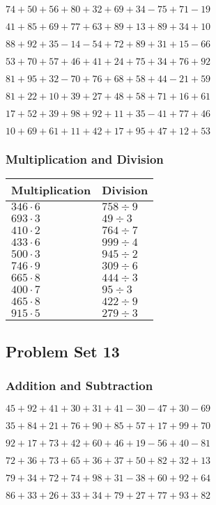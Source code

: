 \(74+50+56+80+32+69+34-75+71-19\)

\(41+85+69+77+63+89+13+89+34+10\)

\(88+92+35-14-54+72+89+31+15-66\)

\(53+70+57+46+41+24+75+34+76+92\)

\(81+95+32-70+76+68+58+44-21+59\)

\(81+22+10+39+27+48+58+71+16+61\)

\(17+52+39+98+92+11+35-41+77+46\)

\(10+69+61+11+42+17+95+47+12+53\)

\hypertarget{multiplication-and-division-11}{%
\subsubsection{Multiplication and
Division}\label{multiplication-and-division-11}}

\begin{longtable}[]{@{}ll@{}}
\toprule
Multiplication & Division\tabularnewline
\midrule
\endhead
\(346\cdot6\) & \(758÷9\)\tabularnewline
\(693\cdot3\) & \(49÷3\)\tabularnewline
\(410\cdot2\) & \(764÷7\)\tabularnewline
\(433\cdot6\) & \(999÷4\)\tabularnewline
\(500\cdot3\) & \(945÷2\)\tabularnewline
\(746\cdot9\) & \(309÷6\)\tabularnewline
\(665\cdot8\) & \(444÷3\)\tabularnewline
\(400\cdot7\) & \(95÷3\)\tabularnewline
\(465\cdot8\) & \(422÷9\)\tabularnewline
\(915\cdot5\) & \(279÷3\)\tabularnewline
\bottomrule
\end{longtable}

\hypertarget{problem-set-13}{%
\subsection{Problem Set 13}\label{problem-set-13}}

\hypertarget{addition-and-subtraction-12}{%
\subsubsection{Addition and
Subtraction}\label{addition-and-subtraction-12}}

\(45+92+41+30+31+41-30-47+30-69\)

\(35+84+21+76+90+85+57+17+99+70\)

\(92+17+73+42+60+46+19-56+40-81\)

\(72+36+73+65+36+37+50+82+32+13\)

\(79+34+72+74+98+31-38+60+92+64\)

\(86+33+26+33+34+79+27+77+93+82\)

